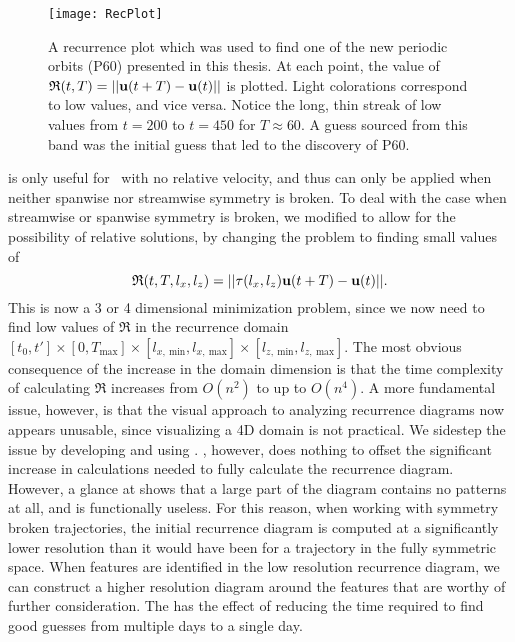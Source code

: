 \begin{figure}[h]
\texttt{[image: RecPlot]}
\caption{A recurrence plot which was used to find one of the new periodic orbits (P60) presented in this thesis. At each point, the value of  $\mathfrak{R}(t,T) = ||\mathbf{u}(t+T) - \mathbf{u}(t)||$ is plotted. Light colorations correspond to low values, and vice versa. Notice the long, thin streak of low values from $t = 200$ to $t = 450$  for $T \approx 60$. A guess sourced from this band was the initial guess that led to the discovery of P60.}\label{fig:recurrenceMinimum}
\end{figure}
  is only useful for \ecs\ with no relative velocity, and thus can only be applied when neither spanwise nor streamwise symmetry is broken. To deal with the case when streamwise or spanwise symmetry is broken, we modified  to allow for the possibility of relative solutions, by changing the problem to finding small values of 
 \begin{equation}\label{eq:4DrecurrenceEQ}
 \mathfrak{R}(t,T,l_x,l_z) = ||\tau(l_x,l_z)\mathbf{u}(t+T) - \mathbf{u}(t)||.
  \end{equation}
 This is now a 3 or 4 dimensional minimization problem, since we now need to find low values of $\mathfrak{R}$ in the recurrence domain $[t_0,t']\times [0,T_{\textrm{max}}] \times [l_{x,~\textrm{min}},l_{x,~\textrm{max}}] \times [l_{z,~\textrm{min}},l_{z,~\textrm{max}}]$. The most obvious consequence of the increase in the domain dimension is that the time complexity of calculating $\mathfrak{R}$ increases from $O(n^2)$ to up to $O(n^4)$. A more fundamental issue, however, is that the visual approach to analyzing recurrence diagrams  now appears unusable, since visualizing a 4D domain is not practical. We sidestep the issue by developing and using . , however, does nothing to offset the significant increase in calculations needed to fully calculate the recurrence diagram. However, a glance at  shows that a large part of the diagram contains no patterns at all, and is functionally useless. For this reason, when working with symmetry broken trajectories, the initial recurrence diagram is computed at a significantly lower resolution than it would have been for a trajectory in the fully symmetric space. When features are identified in the low resolution recurrence diagram, we can construct a higher resolution diagram around the features that are worthy of further consideration. The has the effect of reducing the time required to find good guesses from multiple days to a single day. 


